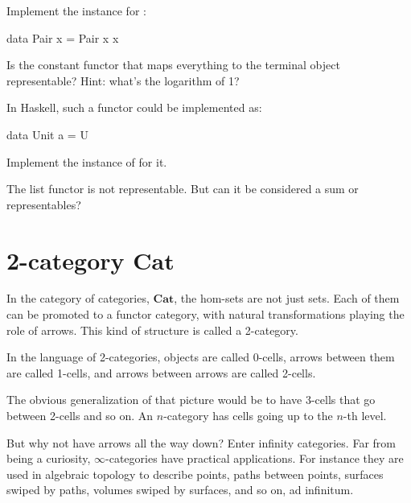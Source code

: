 \documentclass[DaoFP]{subfiles}
\begin{document}
\begin{exercise}
Implement the  instance for :
\begin{haskell}
data Pair x = Pair x x
\end{haskell}
\end{exercise}

\begin{exercise}
Is the constant functor that maps everything to the terminal object representable? Hint: what's the logarithm of 1?

In Haskell, such a functor could be implemented as:
\begin{haskell}
data Unit a = U
\end{haskell}
Implement the instance of  for it.
\end{exercise}

\begin{exercise}
The list functor is not representable. But can it be considered a sum or representables?
\end{exercise}

\section{2-category  $\mathbf{Cat}$ }

In the category of categories, $\mathbf{Cat}$, the hom-sets are not just sets. Each of them can be promoted to a functor category, with natural transformations playing the role of arrows. This kind of structure is called a 2-category. 

In the language of 2-categories, objects are called 0-cells, arrows between them are called 1-cells, and arrows between arrows are called 2-cells. 

The obvious generalization of that picture would be to have 3-cells that go between 2-cells and so on. An $n$-category has cells going up to the $n$-th level. 

But why not have arrows all the way down? Enter infinity categories. Far from being a curiosity, $\infty$-categories have practical applications. For instance they are used in algebraic topology to describe points, paths between points, surfaces swiped by paths, volumes swiped by surfaces, and so on, ad infinitum. 
\end{document}
